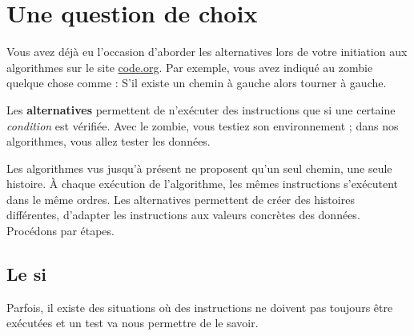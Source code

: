 \chapter{Une question de choix}

Vous avez déjà eu l'occasion d'aborder les alternatives
lors de votre initiation aux algorithmes sur le site
\url{code.org}.
Par exemple, vous avez indiqué au zombie quelque chose comme :
\og{}S'il existe un chemin à gauche alors tourner à gauche\fg{}.

Les \textbf{alternatives} 
permettent de n'exécuter des instructions
que si une certaine \emph{condition} est vérifiée.
Avec le zombie, vous testiez son environnement ;
dans nos algorithmes, vous allez tester les données.

Les algorithmes vus jusqu'à présent ne proposent
qu'un seul \og{}chemin\fg{}, une seule \og{}histoire\fg{}.
À chaque exécution de l'algorithme,
les mêmes instructions s'exécutent dans le même ordres.
Les alternatives permettent de créer des histoires différentes,
d'adapter les instructions aux valeurs concrètes des données.
Procédons par étapes.

\section{Le si}
	
	Parfois, il existe des situations où
	des instructions ne doivent pas toujours
	être exécutées
	et un test va nous permettre de le savoir.
	

